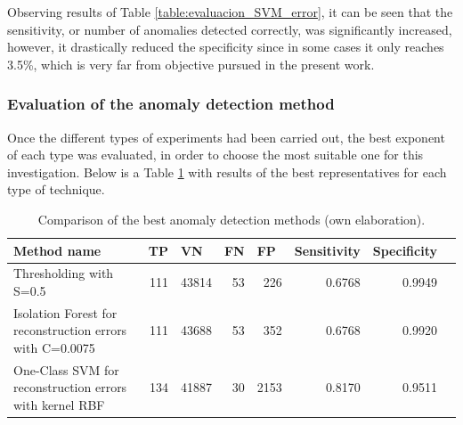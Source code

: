 \begin{itemize}
Observing results of Table \ref{table:evaluacion_SVM_error}, it can be seen that the sensitivity, or number of anomalies detected correctly, was significantly increased, however, it drastically reduced the specificity since in some cases it only reaches 3.5\%, which is very far from objective pursued in the present work.

\end{itemize}

\subsubsection{Evaluation of the anomaly detection method}

Once the different types of experiments had been carried out, the best exponent of each type was evaluated, in order to choose the most suitable one for this investigation. Below is a Table \ref{table:evaluacion_metodo_anomalias} with results of the best representatives for each type of technique.

\begin{table}[H]
\centering
\begin{center}
\begin{tabular}{|p{40mm}|r|r|r|r|r|r|r|}
\hline
\textbf{Method name} & \multicolumn{1}{l|}{\textbf{TP}} & \multicolumn{1}{l|}{\textbf{VN}}& \multicolumn{1}{l|}{\textbf{FN}}& \multicolumn{1}{l|}{\textbf{FP}} & \multicolumn{1}{l|}{\textbf{Sensitivity}} & \multicolumn{1}{l|}{\textbf{Specificity}} \\ \hline
Thresholding with S=0.5 & \cellcolor[HTML]{AADD99} 111 & \cellcolor[HTML]{AADD99} 43814 & \cellcolor[HTML]{FFCE93} 53 & \cellcolor[HTML]{FFCE93} 226 & 0.6768 & 0.9949 \\ \hline
Isolation Forest for reconstruction errors with C=0.0075 & \cellcolor[HTML]{AADD99} 111 & \cellcolor[HTML]{AADD99} 43688 & \cellcolor[HTML]{FFCE93} 53 & \cellcolor[HTML]{FFCE93} 352 & 0.6768 & 0.9920 \\ \hline
One-Class SVM for reconstruction errors with kernel RBF& \cellcolor[HTML]{AADD99} 134 & \cellcolor[HTML]{AADD99} 41887 & \cellcolor[HTML]{FFCE93} 30 & \cellcolor[HTML]{FFCE93} 2153 & 0.8170 & 0.9511 \\ \hline
\end{tabular}
\end{center}
\caption{Comparison of the best anomaly detection methods (own elaboration).}

\label{table:evaluacion_metodo_anomalias}
\end{table}

